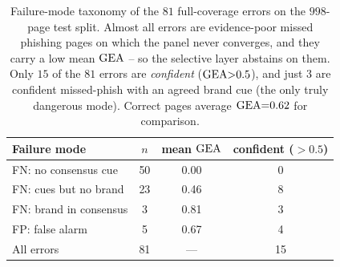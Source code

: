 \begin{table}[!h]
\caption{Failure-mode taxonomy of the $81$ full-coverage errors on the $998$-page test
split. Almost all errors are evidence-poor missed phishing pages on which the panel never
converges, and they carry a low mean $\mathrm{GEA}$ -- so the selective layer abstains on them.
Only $15$ of the $81$ errors are \emph{confident} ($\mathrm{GEA}{>}0.5$), and just $3$ are
confident missed-phish with an agreed brand cue (the only truly dangerous mode). Correct
pages average $\mathrm{GEA}{=}0.62$ for comparison.}
\label{tab:failure_modes}
\footnotesize
\setlength{\tabcolsep}{3.0pt}
\begin{tabular*}{\columnwidth}{@{\extracolsep{\fill}}lccc@{}}
\toprule
Failure mode & $n$ & mean $\mathrm{GEA}$ & confident ($>0.5$) \\
\midrule
FN: no consensus cue        & 50 & 0.00 & 0 \\
FN: cues but no brand       & 23 & 0.46 & 8 \\
FN: brand in consensus      & 3  & 0.81 & 3 \\
FP: false alarm             & 5  & 0.67 & 4 \\
\midrule
All errors                  & 81 & ---  & 15 \\
\bottomrule
\end{tabular*}
\end{table}
